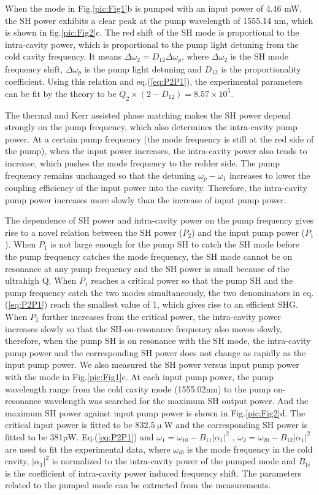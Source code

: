 \documentclass[a4paper,8pt,hyperref, twocolumn]{article}
\begin{document}
When the mode in Fig.\ref{pic:Fig1}b is pumped with an input power of 4.46 mW, the SH power exhibits a clear peak at the pump wavelength of 1555.14 nm, which is shown in fig.\ref{pic:Fig2}c. The red shift of the SH mode is proportional to the intra-cavity power, which is proportional to the pump light detuning from the cold cavity frequency. It means $\Delta \omega_2 = D_{12}\Delta \omega_p$, where $\Delta \omega_2$ is the SH mode frequency shift, $\Delta \omega_p$ is the pump light detuning and $D_{12}$ is the proportionality coefficient.  Using this relation and eq.(\ref{eq:P2P1}), the experimental parameters can be fit by the theory to be $Q_2\times(2-D_{12})=8.57\times 10^5$.

The thermal and Kerr assisted phase matching makes the SH power depend strongly on the pump frequency, which also determines the intra-cavity pump power. At a certain pump frequency (the mode frequency is still at the red side of the pump), when the input power increases, the intra-cavity power also tends to increase, which pushes the mode frequency to the redder side. The pump frequency remains unchanged so that the detuning $\omega_p-\omega_1$ increases to lower the coupling efficiency of the input power into the cavity. Therefore, the intra-cavity pump power increases more slowly than the increase of input pump power. 

The dependence of SH power and intra-cavity power on the pump frequency gives rise to a novel relation between the SH power ($P_2$) and the input pump power ($P_1$). When $P_1$ is not large enough for the pump SH to catch the SH mode before the pump frequency catches the mode frequency, the SH mode cannot be on resonance at any pump frequency and the SH power is small because of the ultrahigh Q. When $P_1$ reaches a critical power so that the pump SH and the pump frequency catch the two modes simultaneously, the two denominators in eq.(\ref{eq:P2P1}) reach the smallest value of 1, which gives rise to an efficient SHG. When $P_1$ further increases from the critical power, the intra-cavity power increases slowly so that the SH-on-resonance frequency also moves slowly, therefore, when the pump SH is on resonance with the SH mode, the intra-cavity pump power and the corresponding SH power does not change as rapidly as the input pump power. We also measured the SH power versus input pump power with the mode in Fig.\ref{pic:Fig1}c. At each input pump power, the pump wavelength range from the cold cavity mode (1555.02nm) to the pump on-resonance wavelength was searched for the maximum SH output power. And the maximum SH power against input pump power is shown in Fig.\ref{pic:Fig2}d. The critical input power is fitted to be 832.5$\upmu$W and the corresponding SH power is fitted to be 381pW. Eq.(\ref{eq:P2P1}) and $\omega_1 = \omega_{10}-B_{11}|\alpha_1|^2$ \cite{carmon2004dynamical}, $\omega_2 = \omega_{20}-B_{12}|\alpha_1|^2$ are used to fit the experimental data, where $\omega_{i0}$ is the mode frequency in the cold cavity, $|\alpha_1|^2$ is normalized to the intra-cavity power of the pumped mode and $B_{1i}$ is the coefficient of intra-cavity power induced frequency shift. The parameters related to the pumped mode can be extracted from the measurements. 
\end{document}
